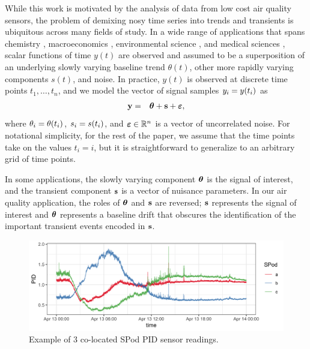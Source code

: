 \documentclass[aoas]{imsart}
\newcommand{\Real}{\mathbb{R}}
\newcommand{\V}[1]{{\bm{\mathbf{\MakeLowercase{#1}}}}} %
\newcommand{\VE}[2]{\MakeLowercase{#1}_{#2}} %
\begin{document}
While this work is motivated by the analysis of data from low cost air quality sensors, the problem of demixing nosy time series into trends and transients is ubiquitous across many fields of study. In a wide range of applications that spans chemistry \citep{Ning2014}, macroeconomics \citep{yamada2017estimating}, environmental science \citep{brantley2014mobile}, and medical sciences \citep{pettersson2013algorithm, marandi2015qualitative}, scalar functions of time $y(t)$ are observed and assumed to be a superposition of an underlying slowly varying baseline trend $\theta(t)$, other more rapidly varying components $s(t)$, and noise. In practice, $y(t)$ is observed at discrete time points $t_1, \ldots, t_n$, and we model the vector of signal samples $\VE{y}{i} = y(t_i)$ as
\begin{eqnarray*}
	\V{y} & = & \V{\theta} + \V{s} + \V{\varepsilon},
\end{eqnarray*}
where $\VE{\theta}{i} = \theta(t_i)$, $\VE{s}{i} = s(t_i)$, and $\V{\varepsilon} \in \Real^n$ is a vector of uncorrelated noise. For notational simplicity, for the rest of the paper, we assume that the time points take on the values $t_i = i$, but it is straightforward to generalize to an arbitrary grid of time points.

In some applications, the slowly varying component $\V{\theta}$ is the signal of interest, and the transient component $\V{s}$ is a vector of nuisance parameters. In our air quality application, the roles of $\V{\theta}$ and $\V{s}$ are reversed; $\V{s}$ represents the signal of interest and $\V{\theta}$ represents a baseline drift that obscures the identification of the important transient events encoded in $\V{s}$. 

\begin{figure}[t!]
	\includegraphics[width = \linewidth]{Figures/uncorrected_data.png}
	\caption{Example of 3 co-located SPod PID sensor readings.}
	\label{fig:raw_spod}
\end{figure}
\end{document}
